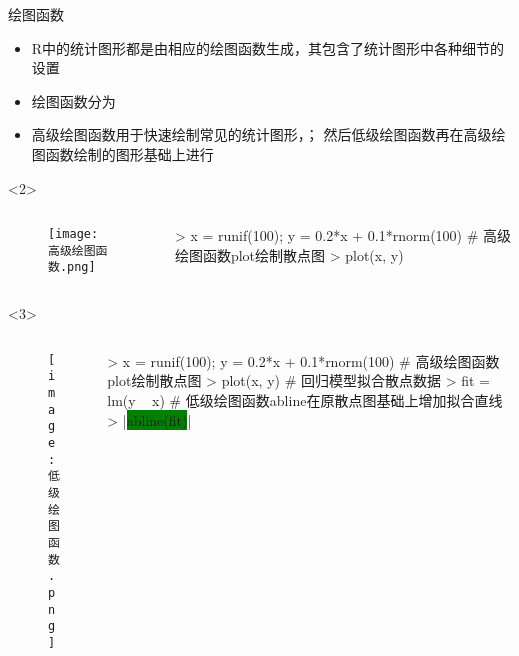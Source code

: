\begin{frame}[t,fragile]{\subsecname}{绘图函数}
\begin{itemize}
\item R中的统计图形都是由相应的绘图函数生成，其包含了统计图形中各种细节的设置
\item 绘图函数分为
\item 高级绘图函数用于快速绘制常见的统计图形，；
然后低级绘图函数再在高级绘图函数绘制的图形基础上进行
\end{itemize}

\begin{overlayarea}{\textwidth}{\textheight}
\begin{onlyenv}<2>
\begin{columns}
        \begin{column}{.4\textwidth}
          \begin{figure}
            \centering
            \texttt{[image: 高级绘图函数.png]}
          \end{figure}
        \end{column}

        \begin{column}{.6\textwidth}
 \centering
\begin{rcode}
> x = runif(100); y = 0.2*x + 0.1*rnorm(100)
# 高级绘图函数plot绘制散点图
> plot(x, y)
\end{rcode}
        \end{column}
      \end{columns}
\end{onlyenv}

\begin{onlyenv}<3>
\begin{columns}
        \begin{column}{.4\textwidth}
          \begin{figure}
            \centering
            \texttt{[image: 低级绘图函数.png]}
          \end{figure}
        \end{column}

        \begin{column}{.6\textwidth}
 \centering
\begin{rcode}
> x = runif(100); y = 0.2*x + 0.1*rnorm(100)
# 高级绘图函数plot绘制散点图
> plot(x, y)
# 回归模型拟合散点数据
> fit = lm(y ~ x)
# 低级绘图函数abline在原散点图基础上增加拟合直线
> |\colorbox{green}{abline(fit)}|
\end{rcode}
        \end{column}
      \end{columns}
\end{onlyenv}
\end{overlayarea}  
\end{frame}

